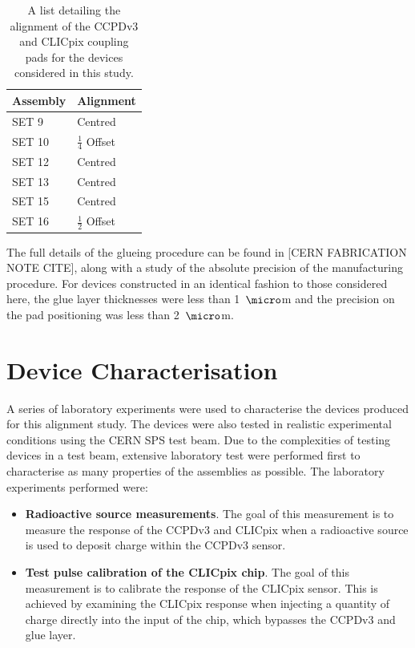 \begin{table}[h!]
\centering
\begin{tabular}{ l l }
\hline
Assembly & Alignment \\ 
\hline
SET 9 & Centred \\
SET 10 & $\frac{1}{4}$ Offset \\
SET 12 & Centred \\
SET 13 & Centred \\
SET 15 & Centred \\
SET 16 & $\frac{1}{2}$ Offset \\
\hline
\end{tabular}
\caption[A list detailing the alignment of the CCPDv3 and CLICpix coupling pads for the devices considered in this study.]{A list detailing the alignment of the CCPDv3 and CLICpix coupling pads for the devices considered in this study.}
\label{table:alignment}
\end{table}

The full details of the glueing procedure can be found in [CERN FABRICATION NOTE CITE], along with a study of the absolute precision of the manufacturing procedure.  For devices constructed in an identical fashion to those considered here, the glue layer thicknesses were less than 1~${\micro}$m and the precision on the pad positioning was less than 2~${\micro}$m.  


\section{Device Characterisation}
A series of laboratory experiments were used to characterise the devices produced for this alignment study.  The devices were also tested in realistic experimental conditions using the CERN SPS test beam.  Due to the complexities of testing devices in a test beam, extensive laboratory test were performed first to characterise as many properties of the assemblies as possible.  The laboratory experiments performed were:

\begin{itemize}
\item \textbf{Radioactive source measurements}.  The goal of this measurement is to measure the response of the CCPDv3 and CLICpix when a radioactive source is used to deposit charge within the CCPDv3 sensor.  
\item \textbf{Test pulse calibration of the CLICpix chip}.  The goal of this measurement is to calibrate the response of the CLICpix sensor.  This is achieved by examining the CLICpix response when injecting a quantity of charge directly into the input of the chip, which bypasses the CCPDv3 and glue layer.
\end{itemize} 

